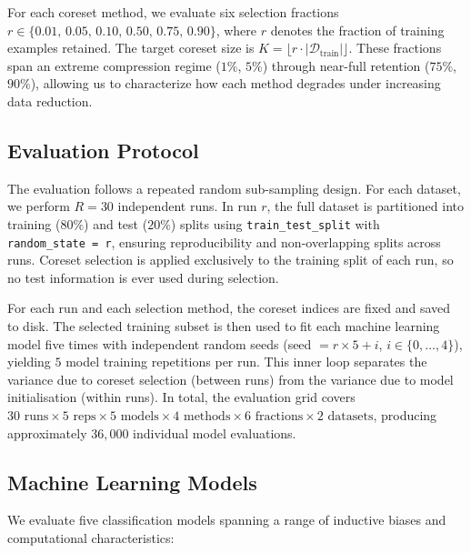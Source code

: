 \documentclass{article}
\begin{document}
For each coreset method, we evaluate six selection fractions
$r \in \{0.01,\, 0.05,\, 0.10,\, 0.50,\, 0.75,\, 0.90\}$,
where $r$ denotes the fraction of training examples retained.
The target coreset size is $K = \lfloor r \cdot |\mathcal{D}_\text{train}| \rfloor$.
These fractions span an extreme compression regime ($1\%$, $5\%$) through
near-full retention ($75\%$, $90\%$), allowing us to characterize how each
method degrades under increasing data reduction.

\subsection{Evaluation Protocol}

The evaluation follows a repeated random sub-sampling design.
For each dataset, we perform $R = 30$ independent runs.
In run $r$, the full dataset is partitioned into training ($80\%$) and
test ($20\%$) splits using \texttt{train\_test\_split} with
\texttt{random\_state\,=\,r}, ensuring reproducibility and non-overlapping
splits across runs.
Coreset selection is applied exclusively to the training split of each run,
so no test information is ever used during selection.

For each run and each selection method, the coreset indices are fixed and
saved to disk.
The selected training subset is then used to fit each machine learning model
five times with independent random seeds
(seed $= r \times 5 + i$, $i \in \{0,\ldots,4\}$),
yielding $5$ model training repetitions per run.
This inner loop separates the variance due to coreset selection (between runs)
from the variance due to model initialisation (within runs).
In total, the evaluation grid covers
$30 \text{ runs} \times 5 \text{ reps} \times 5 \text{ models} \times
 4 \text{ methods} \times 6 \text{ fractions} \times 2 \text{ datasets}$,
producing approximately $36{,}000$ individual model evaluations.

\subsection{Machine Learning Models}

We evaluate five classification models spanning a range of inductive biases
and computational characteristics:
\end{document}
